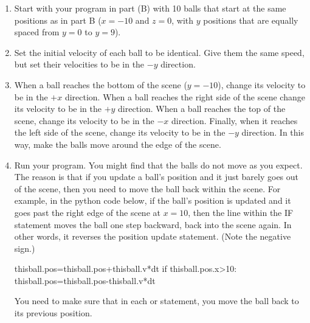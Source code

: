 \begin{description}
\begin{enumerate}
	\item Start with your program in part (B) with 10 balls that start at the same positions as in part B ($x=-10$ and $z=0$, with $y$ positions that are equally spaced from $y=0$ to $y=9$).
	\item Set the initial velocity of each ball to be identical. Give them the same speed, but set their velocities to be in the $-y$ direction.
	\item When a ball reaches the bottom of the scene ($y=-10$), change its velocity to be in the $+x$ direction. When a ball reaches the right side of the scene change its velocity to be in the $+y$ direction. When a ball reaches the top of the scene, change its velocity to be in the $-x$ direction. Finally, when it reaches the left side of the scene, change its velocity to be in the $-y$ direction. In this way, make the balls move around the edge of the scene.\\
	\item Run your program. You might find that the balls do not move as you expect. The reason is that if you update a ball's position and it just barely goes out of the scene, then you need to move the ball back within the scene. For example, in the python code below, if the ball's position is updated and it goes past the right edge of the scene at $x=10$, then the line within the IF statement moves the ball one step backward, back into the scene again. In other words, it reverses the position update statement. (Note the negative sign.)

\begin{myvpython}
        thisball.pos=thisball.pos+thisball.v*dt
        if thisball.pos.x>10:
            thisball.pos=thisball.pos-thisball.v*dt
\end{myvpython}

You need to make sure that in each  or  statement, you move the ball back to its previous position.
	
\end{enumerate}

\end{description}

